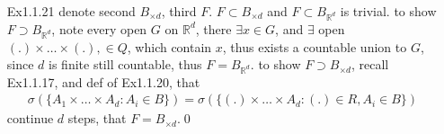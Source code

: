 \documentclass[paper=a4, fontsize=11pt]{scrartcl} %
\numberwithin{equation}{section} %
\numberwithin{figure}{section} %
\numberwithin{table}{section} %
\begin{document}
\begin{itemize}
\begin{itemize}
\begin{align}
				&= (A^c \cup H^c) \cap  H \\
				&= (A\cap H)^c \cap H
		\end{align}
		by closed under intersection, i.e. $A^c\cap H\in \mathcal{H}$, that $A^c\in \mathcal{H}^H$; similarily
		\begin{align}
			(\bigcup_i A_i)\cap H &= ((\bigcup_i A_i)\cup H^c) \cap H\\
				&= (\bigcup_i(A_i\cup H^c)) \cap H\\
				&= \bigcup_i ((A_i\cap H)^c \cap H)
		\end{align}
		by closed under union, that $\bigcup_i A_i \in \mathcal{H}^H$.\qed
		\item[(c)] let $H_1\subseteq H_2$, then
		\begin{align}
			A\cap H_1 &= A\cap (H_1 \cap H_2)\\
				&= (A\cap H_2) \cap H_1
		\end{align}
		i.e. $A\in \mathcal{H}^{H_2}$ will imply $A\in \mathcal{H}^{H_1}$, so non-increasing. Thus $\mathcal{H}^{H\cup H'} \subseteq \mathcal{H}^H \cap \mathcal{H}^{H'}$, and if $A\in \mathcal{H}^H \cap \mathcal{H}^{H'}$, that
		\begin{align}
			A \cap (H\cup H') = (A\cap H) \cup (A\cap H')
		\end{align}
		implies $A\in \mathcal{H}^{H\cup H'}$, proved equality.\qed
	\end{itemize}
	\item[Ex1.1.21] denote second $B_{\times d}$, third $F$. $F\subset B_{\times d}$ and $F\subset B_{\mathbb{R}^d}$ is trivial. to show $F\supset B_{\mathbb{R}^d}$, note every open $G$ on $\mathbb{R}^d$, there $\exists x\in G$, and $\exists$ open $(.)\times\dots \times(.), \in Q$, which contain $x$, thus exists a countable union to $G$, since $d$ is finite still countable, thus $F= B_{\mathbb{R}^d}$. to show $F\supset B_{\times d}$, recall Ex1.1.17, and def of Ex1.1.20, that
	\begin{align}
		\sigma(\{A_1\times\dots \times A_d: A_i\in B\}) = \sigma(\{ (.)\times\dots \times A_d: (.)\in R, A_i\in B\})
	\end{align}
	continue $d$ steps, that $F= B_{\times d}$.\qed
\end{itemize}
\end{document}
